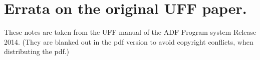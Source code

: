 \documentclass[11pt,a4paper]{report}
\begin{document}
\chapter{Errata on the original UFF paper.}
These notes are taken from the UFF manual of the ADF Program system
Release 2014. (They are blanked out in the pdf version to avoid
copyright conflicts, when distributing the pdf.)








\end{document}
